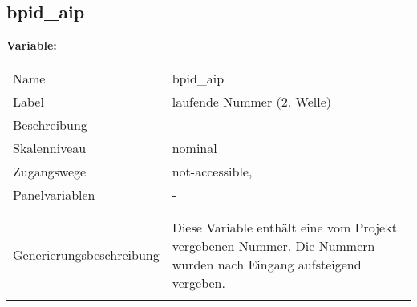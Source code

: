 	
	
	\subsection{bpid\_aip}
	\label{subSection:bpid_aip}

	\noindent\textbf{Variable:}\\
		\begin{tabular}{lL{11.3cm}}
			\label{tableVariable:bpid_aip}
			Name & bpid\_aip \\
			Label & laufende Nummer (2. Welle) \\
			Beschreibung & - \\
			Skalenniveau & nominal \\
			Zugangswege &
				not-accessible,
 \\
			Panelvariablen & -
			 \\
			 \\
 \\
					Generierungsbeschreibung & Diese Variable enthält eine vom Projekt vergebenen Nummer. Die Nummern wurden nach Eingang aufsteigend vergeben. 
				 \\	
			 \\
		\end{tabular}






	
	\newpage
